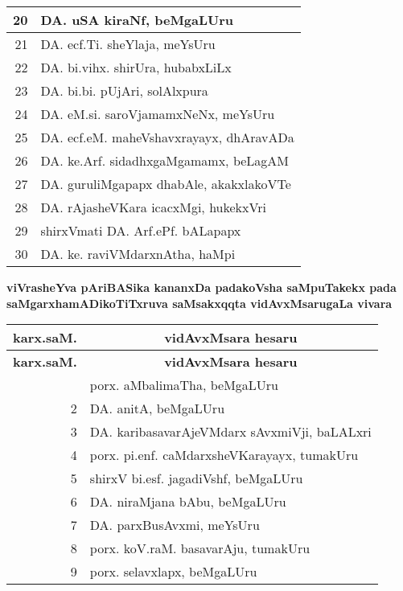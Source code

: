 {\begin{longtable}{|r|p{10cm}|}
\hline
20 & DA. uSA kiraNf, beMgaLUru\\
\hline
21 & DA. ecf.Ti. sheYlaja, meYsUru\\
\hline
22 & DA. bi.vihx. shirUra, hubabxLiLx\\
\hline
23 & DA. bi.bi. pUjAri, solAlxpura\\
\hline
24 & DA. eM.si. saroVjamamxNeNx, meYsUru\\
\hline
25 & DA. ecf.eM. maheVshavxrayayx, dhAravADa\\
\hline
26 & DA. ke.Arf. sidadhxgaMgamamx, beLagAM\\
\hline
27 & DA. guruliMgapapx dhabAle, akakxlakoVTe\\
\hline
28 & DA. rAjasheVKara icacxMgi, hukekxVri\\
\hline
29 & shirxVmati DA. Arf.ePf. bALapapx\\
\hline
30 & DA. ke. raviVMdarxnAtha, haMpi\\
\hline
\end{longtable}}

\vskip 1cm


\begin{center}
{\large\bf viVrasheYva pAriBASika kananxDa padakoVsha saMpuTakekx pada saMgarxha\break mADikoTiTxruva saMsakxqqta vidAvxMsarugaLa vivara}
\end{center}

{\renewcommand{\arraystretch}{1.4}
\begin{longtable}{|r|p{10cm}|}
\hline
{\bf karx.saM.} & \multicolumn{1}{c|}{\bf vidAvxMsara hesaru}\\
\hline
\endfirsthead
\hline
{\bf karx.saM.} & \multicolumn{1}{c|}{\bf vidAvxMsara hesaru}\\
\hline
\endhead
\hline
\endfoot
\endlastfoot
1 & porx. aMbalimaTha, beMgaLUru\\
\hline
2 & DA. anitA, beMgaLUru\\
\hline
3 & DA. karibasavarAjeVMdarx sAvxmiVji, baLALxri\\
\hline
4 & porx. pi.enf. caMdarxsheVKarayayx, tumakUru\\
\hline
5 & shirxV bi.esf. jagadiVshf, beMgaLUru\\
\hline
6 & DA. niraMjana bAbu, beMgaLUru\\
\hline
7 & DA. parxBusAvxmi, meYsUru\\
\hline
8 & porx. koV.raM. basavarAju, tumakUru\\
\hline
9 & porx. selavxlapx, beMgaLUru\\
\hline
\end{longtable}}
